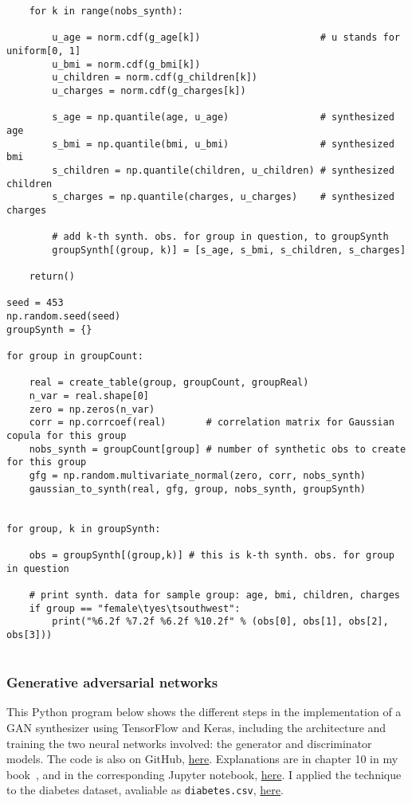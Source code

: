 \documentclass[oneside,10pt]{book}
\begin{document}
\begin{lstlisting}
    for k in range(nobs_synth):   

        u_age = norm.cdf(g_age[k])                     # u stands for uniform[0, 1]
        u_bmi = norm.cdf(g_bmi[k])
        u_children = norm.cdf(g_children[k])
        u_charges = norm.cdf(g_charges[k])

        s_age = np.quantile(age, u_age)                # synthesized age 
        s_bmi = np.quantile(bmi, u_bmi)                # synthesized bmi
        s_children = np.quantile(children, u_children) # synthesized children
        s_charges = np.quantile(charges, u_charges)    # synthesized charges

        # add k-th synth. obs. for group in question, to groupSynth
        groupSynth[(group, k)] = [s_age, s_bmi, s_children, s_charges] 

    return()

seed = 453
np.random.seed(seed)
groupSynth = {}

for group in groupCount:

    real = create_table(group, groupCount, groupReal) 
    n_var = real.shape[0] 
    zero = np.zeros(n_var) 
    corr = np.corrcoef(real)       # correlation matrix for Gaussian copula for this group
    nobs_synth = groupCount[group] # number of synthetic obs to create for this group
    gfg = np.random.multivariate_normal(zero, corr, nobs_synth) 
    gaussian_to_synth(real, gfg, group, nobs_synth, groupSynth)


for group, k in groupSynth:

    obs = groupSynth[(group,k)] # this is k-th synth. obs. for group in question

    # print synth. data for sample group: age, bmi, children, charges
    if group == "female\tyes\tsouthwest":
        print("%6.2f %7.2f %6.2f %10.2f" % (obs[0], obs[1], obs[2], obs[3]))


\end{lstlisting}

\subsubsection{Generative adversarial networks}

This Python program below shows the different steps in the implementation of a GAN synthesizer using TensorFlow and Keras, including
 the architecture and training the two neural networks involved: the generator and discriminator models. The code
 is also on GitHub, \href{https://github.com/VincentGranville/Main/blob/main/GAN_diabetes.py}{here}. Explanations are in chapter 10 in my 
book~\cite{vgelsevier}, and in the corresponding Jupyter notebook, \href{https://github.com/VincentGranville/Notebooks/blob/main/GAN_diabetes.ipynb}{here}. I applied the technique to the diabetes dataset, avaliable as \texttt{diabetes.csv}, 
\href{https://github.com/VincentGranville/Main/blob/main/diabetes.csv}{here}. 
\end{document}

